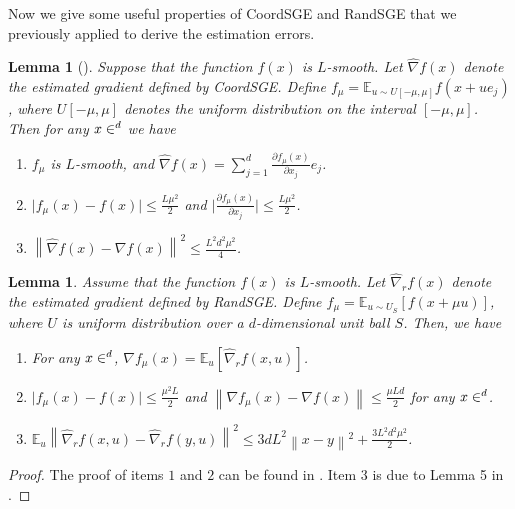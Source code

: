 \documentclass[iicol,sn-basic]{sn-jnl}
\theoremstyle{thmstyleone}%
\theoremstyle{thmstyletwo}%
\theoremstyle{thmstylethree}%
\let\R\relax
\newcommand*{\R}{\mathbb{R}}
\newcommand*{\E}{\mathbb{E}}
\newcommand{\norm}[1]{\left\lVert#1\right\rVert}
\newcommand{\abs}[1]{\vert#1\vert}
\newtheorem{lemma}[theorem]{Lemma}
\begin{document}
 Now we give some useful properties of CoordSGE and RandSGE that we previously applied to derive the estimation errors.
\begin{lemma}[\cite{liu2018zeroth}]\label{CooSGE}
Suppose that the function $f(x)$ is $L$-smooth. Let $\hat{\nabla} f(x)$ denote the estimated gradient defined by CoordSGE. Define $f_{\mu} = \E_{u\sim U[-\mu, \mu]} f(x+ue_j)$, where $U[-\mu,\mu]$ denotes the uniform distribution on the interval $[-\mu, \mu]$. Then for any $x \in \R^d$ we have 
\begin{enumerate}
\item $f_{\mu}$ is $L$-smooth, and 
$\hat{\nabla} f(x) = \sum_{j=1}^d \frac{\partial f_{\mu}(x)}{\partial x_j}e_j$.

\item $\abs{f_{\mu}(x) - f(x)} \leq \frac{L\mu^2}{2}$ and $\abs{\frac{\partial f_{\mu}(x)}{\partial x_j}} \leq \frac{L\mu^2}{2}$.
 
\item $\norm{\hat{\nabla} f(x) - {\nabla} f(x)} ^2 \leq \frac{L^2 d^2 \mu^2}{4}$.
\end{enumerate}  
\end{lemma}
\begin{lemma}\label{SGERand-approx}
Assume that the function $f(x)$ is $L$-smooth. Let $\hat{\nabla}_r f(x)$ denote the estimated gradient defined by RandSGE. Define $f_{\mu} = \E_{u\sim U_S}[f(x+\mu u)]$, where $U$ is uniform distribution over a $d$-dimensional unit ball $S$. Then, we have 
\begin{enumerate}
\item For any $x \in \R^d$, $\nabla f_{\mu}(x) = \E_u[\hat{\nabla}_r f(x,u)]$.\\
\item $\abs{f_{\mu}(x) - f(x)} \leq \frac{\mu^2 L}{2}$ and 
$\norm{\nabla f_{\mu}(x) - \nabla f(x)} \leq \frac{\mu L d}{2}$ for any $x \in \R^d$.\\
\item $\E_{u}\norm{\hat{\nabla}_r f(x,u) - \hat{\nabla}_r f(y,u)}^2 \leq 3dL^2\norm{x-y}^2 + \frac{3L^2d^2\mu^2}{2}$.
\end{enumerate}
\end{lemma}
\begin{proof}
The proof of items $1$ and $2$ can be found in \cite{gao2018information}. Item 3 is due to Lemma 5 in \cite{ji2019improved}.  
\end{proof}
\end{document}
